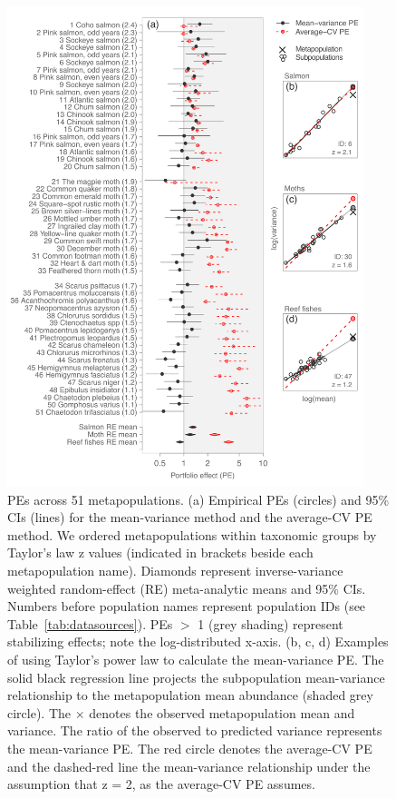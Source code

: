 \begin{figure}[htbp]
  \centering \includegraphics[height=5.5in]{prophets/fig3}
  \caption[PEs across 51 metapopulations.]{
  PEs across 51 metapopulations. (a) Empirical PEs (circles) and 95\%
    CIs (lines) for the mean-variance method and the average-CV PE method.
    We ordered metapopulations within taxonomic groups by Taylor's law z values
    (indicated in brackets beside each metapopulation name). Diamonds represent
    inverse-variance weighted random-effect (RE) meta-analytic means and 95\%
    CIs. Numbers before population names represent population IDs (see
    Table~\ref{tab:datasources}). PEs $>$ 1 (grey shading) represent stabilizing
    effects; note the log-distributed x-axis. (b, c, d) Examples of using
    Taylor's power law to calculate the mean-variance PE. The solid black
    regression line projects the subpopulation mean-variance relationship to the
    metapopulation mean abundance (shaded grey circle). The $\times$ denotes the
    observed metapopulation mean and variance. The ratio of the observed to
    predicted variance represents the mean-variance PE. The red circle denotes
    the average-CV PE and the dashed-red line the mean-variance relationship
    under the assumption that z = 2, as the average-CV PE assumes.
  }
  \label{fig:meta}
\end{figure}

